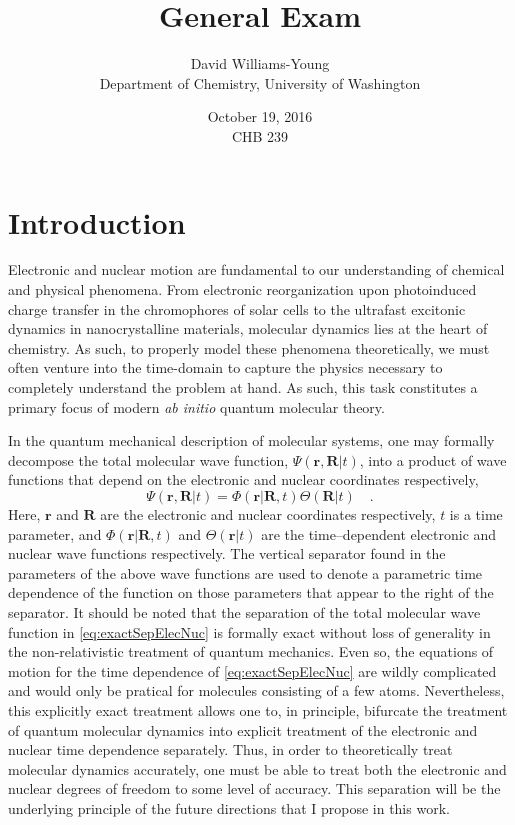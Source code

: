 \documentclass[12pt]{article}
\title{General Exam}
\date{October 19, 2016 \\ CHB 239}
\author{David Williams-Young\\ Department of Chemistry, University of Washington}
\newcommand*\vc[1]{\boldsymbol{#1}}
\begin{document}
\maketitle


\newpage
\section{Introduction}

Electronic and nuclear motion are fundamental to our understanding of chemical
and physical phenomena. From electronic reorganization upon photoinduced charge
transfer in the chromophores of solar cells to the ultrafast excitonic dynamics
in nanocrystalline materials, molecular dynamics lies at the heart of chemistry.
As such, to properly model these phenomena theoretically, we must often venture
into the time-domain to capture the physics necessary to completely understand
the problem at hand. As such, this task constitutes a primary focus of modern
\emph{ab initio} quantum molecular theory.

In the quantum mechanical description of molecular systems, one may formally
decompose the total molecular wave function, $\Psi(\vc{r},\vc{R}\vert t)$, into
a product of wave functions that depend on the electronic and nuclear
coordinates respectively, 
\begin{equation} 
\Psi(\vc{r},\vc{R} \vert t) = \Phi(\vc{r} \vert \vc{R},t) \Theta(\vc{R} \vert t) 
\quad .  
\label{eq:exactSepElecNuc}
\end{equation} 
Here, $\vc{r}$ and $\vc{R}$ are the electronic and nuclear coordinates
respectively, $t$ is a time parameter, and $\Phi(\vc{r} \vert \vc{R}, t)$ and
$\Theta(\vc{r} \vert t)$ are the time--dependent electronic and nuclear wave
functions respectively. The vertical separator found in the parameters of the
above wave functions are used to denote a parametric time dependence of the
function on those parameters that appear to the right of the separator. It
should be noted that the separation of the total molecular wave function in
\cref{eq:exactSepElecNuc} is formally exact\cite{Gross10_PRL123002,
Cederbaum08_JCP124101} without loss of generality in the non-relativistic
treatment of quantum mechanics. Even so, the equations of motion for the time
dependence of \cref{eq:exactSepElecNuc} are wildly complicated\cite{Ghosh15_MP1}
and would only be pratical for molecules consisting of a few atoms.
Nevertheless, this explicitly exact treatment allows one to, in principle,
bifurcate the treatment of quantum molecular dynamics into explicit treatment of
the electronic and nuclear time dependence separately. Thus, in order to
theoretically treat molecular dynamics accurately, one must be able to treat
both the electronic and nuclear degrees of freedom to some level of accuracy.
This separation will be the underlying principle of the future directions that I
propose in this work.
\end{document}

